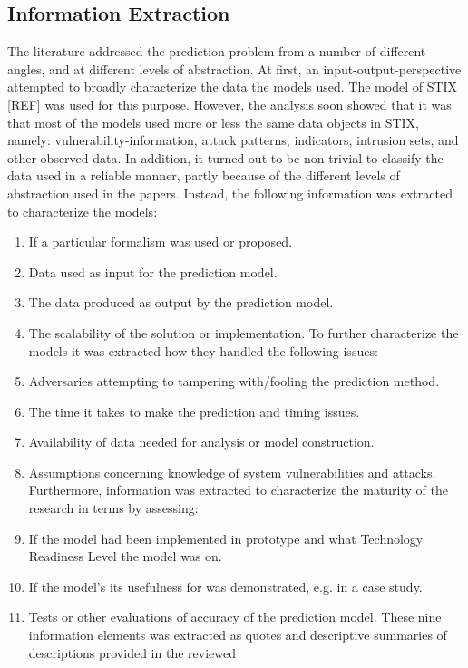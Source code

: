 \documentclass[acmsmall]{acmart}
\begin{document}
\subsection{Information Extraction}
The literature addressed the prediction problem from a number of different angles, and at different levels of abstraction. At first, an input-output-perspective attempted to broadly characterize the data the models used. The model of STIX [REF] was used for this purpose. However, the analysis soon showed that it was that most of the models used more or less the same data objects in STIX, namely: vulnerability-information, attack patterns, indicators, intrusion sets, and other observed data. In addition, it turned out to be non-trivial to classify the data used in a reliable manner, partly because of the different levels of abstraction used in the papers. Instead, the following information was extracted to characterize the models:
\begin{enumerate}
\item If a particular formalism was used or proposed.
\item Data used as input for the prediction model.
\item The data produced as output by the prediction model.
\item The scalability of the solution or implementation. 
To further characterize the models it was extracted how they handled the following issues:
\item Adversaries attempting to tampering with/fooling the prediction method.
\item The time it takes to make the prediction and timing issues.
\item Availability of data needed for analysis or model construction.
\item Assumptions concerning knowledge of system vulnerabilities and attacks.
Furthermore, information was extracted to characterize the maturity of the research in terms by assessing:
\item If the model had been implemented in prototype and what Technology Readiness Level the model was on.
\item If the model’s its usefulness for was demonstrated, e.g. in a case study.
\item Tests or other evaluations of accuracy of the prediction model.
These nine information elements was extracted as quotes and descriptive summaries of descriptions provided in the reviewed 
\end{enumerate}





\end{document}
